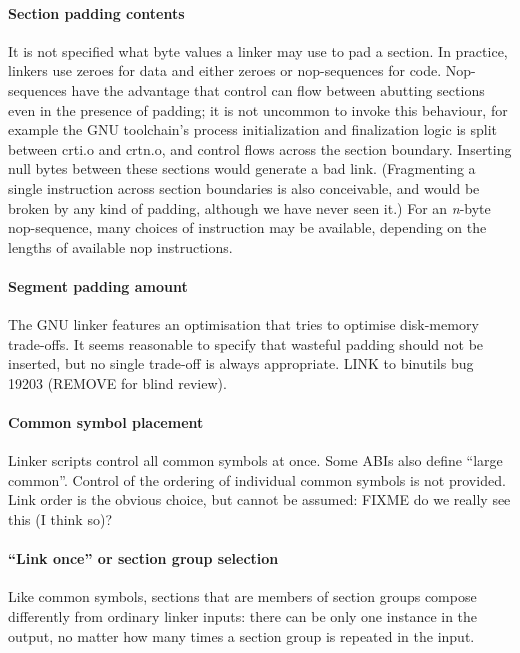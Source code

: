 \paragraph{Section padding contents}
It is not specified what byte values a linker may use
to pad a section.
In practice, linkers use zeroes for data and either zeroes or nop-sequences for code.
Nop-sequences have the advantage that control can flow between abutting sections
even in the presence of padding; 
it is not uncommon to invoke this behaviour, 
for example 
the GNU toolchain's process initialization and finalization logic 
is split between \textsf{crti.o} and \textsf{crtn.o},
and control flows across the section boundary.
Inserting null bytes between these sections would generate a bad link.
(Fragmenting a single instruction across section boundaries
is also conceivable, and would be broken by any kind of padding, 
although we have never seen it.)
For an \textit{n}-byte nop-sequence, 
many choices of instruction may be available, 
depending on the lengths of available nop instructions.


\paragraph{Segment padding amount} 
The GNU linker features an optimisation
that tries to optimise disk-memory trade-offs.
It seems reasonable to specify that 
wasteful padding should not be inserted, but 
no single trade-off is always appropriate.
LINK to binutils bug 19203 (REMOVE for blind review).

\paragraph{Common symbol placement}
Linker scripts control all common symbols at once.
Some ABIs also define ``large common''.
Control of the ordering of individual common symbols
is not provided.
Link order is the obvious choice, but cannot be assumed: FIXME do we really see this (I think so)?

\paragraph{``Link once'' or section group selection}
Like common symbols, 
sections that are members of section groups compose differently
from ordinary linker inputs:
there can be only one instance in the output, no matter how many times
a section group is repeated in the input.

